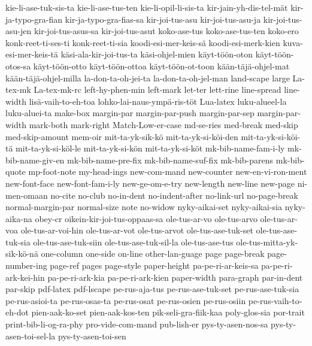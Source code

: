 {  kie-li-ase-tuk-sis-ta
  kie-li-ase-tus-ten
  kie-li-opil-li-sis-ta
  kir-jain-yh-dis-tel-mät
  kir-ja-typo-gra-fian
  kir-ja-typo-gra-fias-sa
  kir-joi-tus-asu
  kir-joi-tus-asu-ja
  kir-joi-tus-asu-jen
  kir-joi-tus-asus-sa
  kir-joi-tus-asut
  koko-ase-tus
  koko-ase-tus-ten
  koko-ero
  konk-reet-ti-ses-ti
  konk-reet-ti-sia
  koodi-esi-mer-keis-sä
  koodi-esi-merk-kien
  kuva-esi-mer-keis-tä
  käsi-ala-kir-joi-tus-ta
  käsi-ohjel-mien
  käyt-töön-oton
  käyt-töön-otos-sa
  käyt-töön-otto
  käyt-töön-ottoa
  käyt-töön-ot-toon
  kään-täjä-ohjel-mat
  kään-täjä-ohjel-milla
  la-don-ta-oh-jei-ta
  la-don-ta-oh-jel-man
  land-scape
  large
  La-tex-mk
  La-tex-mk-rc
  left-hy-phen-min
  left-mark
  let-ter
  lett-rine
  line-spread
  line-width
  lisä-vaih-to-eh-toa
  lohko-lai-naus-ympä-ris-töt
  Lua-latex
  luku-alueel-la
  luku-aluei-ta
  make-box
  margin-par
  margin-par-push
  margin-par-sep
  margin-par-width
  mark-both
  mark-right
  Match-Low-er-case
  md-se-ries
  med-break
  med-skip
  med-skip-amount
  mem-oir
  mit-ta-yk-sik-kö
  mit-ta-yk-si-köi-den
  mit-ta-yk-si-köi-tä
  mit-ta-yk-si-köl-le
  mit-ta-yk-si-kön
  mit-ta-yk-si-köt
  mk-bib-name-fam-i-ly
  mk-bib-name-giv-en
  mk-bib-name-pre-fix
  mk-bib-name-suf-fix
  mk-bib-parens
  mk-bib-quote
  mp-foot-note
  my-head-ings
  new-com-mand
  new-counter
  new-en-vi-ron-ment
  new-font-face
  new-font-fam-i-ly
  new-ge-om-e-try
  new-length
  new-line
  new-page
  ni-men-omaan
  no-cite
  no-club
  no-in-dent
  no-indent-after
  no-link-url
  no-page-break
  normal-margin-par
  normal-size
  note
  no-widow
  nyky-aikai-set
  nyky-aikai-sia
  nyky-aika-na
  obey-cr
  oikein-kir-joi-tus-oppaas-sa
  ole-tus-ar-vo
  ole-tus-arvo
  ole-tus-ar-voa
  ole-tus-ar-voi-hin
  ole-tus-ar-vot
  ole-tus-arvot
  ole-tus-ase-tuk-set
  ole-tus-ase-tuk-sia
  ole-tus-ase-tuk-siin
  ole-tus-ase-tuk-sil-la
  ole-tus-ase-tus
  ole-tus-mitta-yk-sik-kö-nä
  one-column
  one-side
  on-line
  other-lan-guage
  page
  page-break
  page-number-ing
  page-ref
  pages
  page-style
  paper-height
  pa-pe-ri-ar-keis-sa
  pa-pe-ri-ark-kei-hin
  pa-pe-ri-ark-kia
  pa-pe-ri-ark-kien
  paper-width
  para-graph
  par-in-dent
  par-skip
  pdf-latex
  pdf-lscape
  pe-rus-aja-tus
  pe-rus-ase-tuk-set
  pe-rus-ase-tuk-sia
  pe-rus-asioi-ta
  pe-rus-osas-ta
  pe-rus-osat
  pe-rus-osien
  pe-rus-osiin
  pe-rus-vaih-to-eh-dot
  pien-aak-ko-set
  pien-aak-kos-ten
  pik-seli-gra-fiik-kaa
  poly-glos-sia
  por-trait
  print-bib-li-og-ra-phy
  pro-vide-com-mand
  pub-lish-er
  pys-ty-asen-nos-sa
  pys-ty-asen-toi-sel-la
  pys-ty-asen-toi-sen
}

